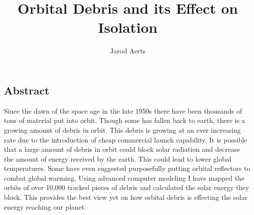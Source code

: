 \documentclass[11pt]{article}
\author{Jarod Aerts\vspace{-2ex}%
}
\title{Orbital Debris and its Effect on Isolation\vspace{-2ex}%
}
\begin{document}
\maketitle

\begin{center}
	\section*{Abstract} \label{abstract}
	Since the dawn of the space age in the late 1950s there have been thousands of tons of material put into orbit. Though some has fallen back to earth, there is a growing amount of debris in orbit. This debris is growing at an ever increasing rate due to the introduction of cheap commercial launch capability. It is possible that a large amount of debris in orbit could block solar radiation and decrease the amount of energy received by the earth. This could lead to lower global temperatures. Some have even suggested purposefully putting orbital reflectors to combat global warming. Using advanced computer modeling I have mapped the orbits of over 10,000 tracked pieces of debris and calculated the solar energy they block. This provides the best view yet on how orbital debris is effecting the solar energy reaching our planet.
\end{center}
\end{document}
